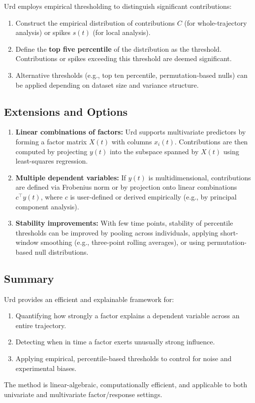 \documentclass{article}
\begin{document}
Urd employs empirical thresholding to distinguish significant contributions:
\begin{enumerate}
    \item Construct the empirical distribution of contributions $C$ (for whole-trajectory analysis) or spikes $s(t)$ (for local analysis).
    \item Define the \textbf{top five percentile} of the distribution as the threshold. Contributions or spikes exceeding this threshold are deemed significant.
    \item Alternative thresholds (e.g., top ten percentile, permutation-based nulls) can be applied depending on dataset size and variance structure.
\end{enumerate}

\subsection{Extensions and Options}

\begin{enumerate}
    \item \textbf{Linear combinations of factors:} Urd supports multivariate predictors by forming a factor matrix $X(t)$ with columns $x_i(t)$. Contributions are then computed by projecting $y(t)$ into the subspace spanned by $X(t)$ using least-squares regression.
    \item \textbf{Multiple dependent variables:} If $y(t)$ is multidimensional, contributions are defined via Frobenius norm or by projection onto linear combinations $c^\top y(t)$, where $c$ is user-defined or derived empirically (e.g., by principal component analysis).
    \item \textbf{Stability improvements:} With few time points, stability of percentile thresholds can be improved by pooling across individuals, applying short-window smoothing (e.g., three-point rolling averages), or using permutation-based null distributions.
\end{enumerate}

\subsection{Summary}

Urd provides an efficient and explainable framework for:
\begin{enumerate}
    \item Quantifying how strongly a factor explains a dependent variable across an entire trajectory.
    \item Detecting when in time a factor exerts unusually strong influence.
    \item Applying empirical, percentile-based thresholds to control for noise and experimental biases.
\end{enumerate}
The method is linear-algebraic, computationally efficient, and applicable to both univariate and multivariate factor/response settings.
\end{document}
